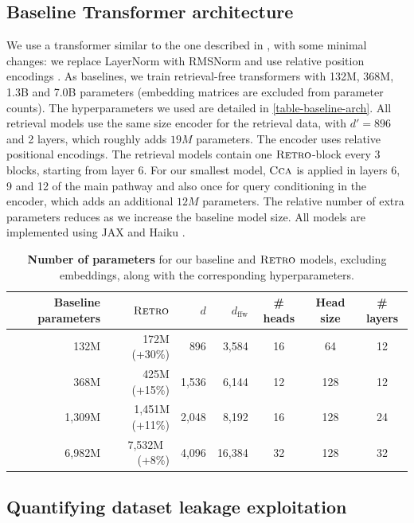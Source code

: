 \documentclass[11pt, a4paper, logo]{deepmind}
\newcommand{\ccca}{\textsc{Cca}}
\newcommand{\retro}{\textsc{Retro}\xspace}
\newcommand{\dmodel}{d}
\newcommand{\dffw}{d_{\textrm{ffw}}}
\begin{document}
\subsection{Baseline Transformer architecture}
We use a transformer \citep{vaswani2017attention} similar to the one described in \citep{radford2019language}, with some minimal changes: we replace LayerNorm with RMSNorm \citep{zhang2019root} and use relative position encodings \citep{dai2019transformer}. 
As baselines, we train retrieval-free transformers with 132M, 368M, 1.3B and 7.0B parameters (embedding matrices are excluded from parameter counts). The hyperparameters we used are detailed in \autoref{table-baseline-arch}. 
All retrieval models use the same size encoder for the retrieval data, with $d'=896$ and 2 layers, which roughly adds $19M$ parameters. The encoder uses relative positional encodings.
The retrieval models contain one $\retro$-block every 3 blocks, starting from layer 6.
For our smallest model, $\ccca$  is applied in layers 6, 9 and 12 of the main pathway and also once for query conditioning in the encoder, which adds an additional  $12M$ parameters. 
The relative number of extra parameters reduces as we increase the baseline model size.
All models are implemented using JAX \citep{jax2018github} and Haiku \citep{haiku2020github}. 

\begin{table}[b]
    \centering
    \caption{\textbf{Number of parameters} for our baseline and $\retro$ models, excluding embeddings, along with the corresponding hyperparameters.}
    \vspace{2.0mm}
    \begin{tabular}{r r r r c c c}
        Baseline parameters & $\retro$ & $\dmodel$ & $\dffw$ & \# heads & Head size & \# layers \\ 
        \toprule
        132M & 172M (+30\%) & 896 & 3,584 & 16 & 64 & 12 \\
        368M & 425M (+15\%) & 1,536 & 6,144 & 12 & 128 & 12 \\
        1,309M & 1,451M (+11\%) & 2,048 & 8,192 & 16 & 128 & 24 \\
        6,982M & 7,532M $\ $ (+8\%)  & 4,096 & 16,384 & 32 & 128 & 32\\
    \end{tabular}
\label{table-baseline-arch}
\end{table}


\subsection{Quantifying dataset leakage exploitation}\label{sec:leakage-quantification}
\end{document}
